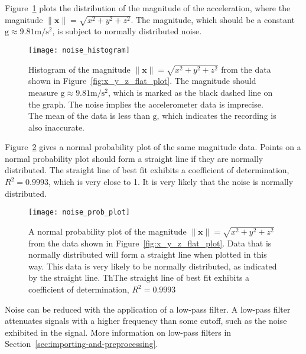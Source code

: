       
      Figure~\ref{fig:noise_histogram} plots the distribution of the magnitude of the acceleration, where the magnitude $\|\mathbf{x}\| = \sqrt{x^2+y^2+z^2}$. The magnitude, which should be a constant $\mathrm{g} \approx 9.81 \si{\meter\per\square\second}$, is subject to normally distributed noise.
      
      \begin{figure}
        \centering
        \texttt{[image: noise\_histogram]}
        \caption[Histogram of the magnitude from the data shown in Figure~\ref{fig:x_y_z_flat_plot}.]{Histogram of the magnitude $\|\mathbf{x}\| = \sqrt{x^2+y^2+z^2}$ from the data shown in Figure~\ref{fig:x_y_z_flat_plot}. The magnitude should measure $ \mathrm{g} \approx 9.81\si{\metre\per\square\second}$, which is marked as the black dashed line on the graph. The noise implies the accelerometer data is imprecise. The mean of the data is less than $\mathrm{g}$, which indicates the recording is also inaccurate.}
        \label{fig:noise_histogram}
      \end{figure}
      
      Figure~\ref{fig:noise_prob_plot} gives a normal probability plot of the same magnitude data. Points on a normal probability plot should form a straight line if they are normally distributed. The straight line of best fit exhibits a coefficient of determination, $R^2 = 0.9993$, which is very close to 1. It is very likely that the noise is normally distributed.
      
      \begin{figure}
        \centering
        \texttt{[image: noise\_prob\_plot]}
        \caption[A normal probability plot of the magnitude from the data shown in Figure~\ref{fig:x_y_z_flat_plot}.]{A normal probability plot of the magnitude $\|\mathbf{x}\| = \sqrt{x^2+y^2+z^2}$  from the data shown in Figure~\ref{fig:x_y_z_flat_plot}. Data that is normally distributed will form a straight line when plotted in this way. This data is very likely to be normally distributed, as indicated by the straight line. ThThe straight line of best fit exhibits a coefficient of determination, $R^2 = 0.9993$}
        \label{fig:noise_prob_plot}
      \end{figure}
      
      
      Noise can be reduced with the application of a low-pass filter. A low-pass filter attenuates signals with a higher frequency than some cutoff, such as the noise exhibited in the signal. More information on low-pass filters in Section~\ref{sec:importing-and-preprocessing}.
      
